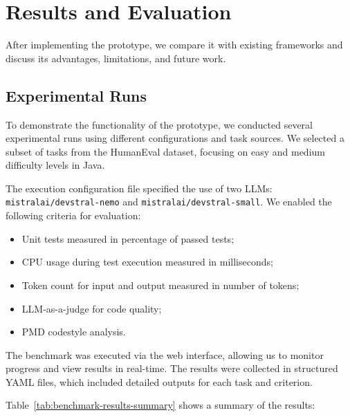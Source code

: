 \section{Results and Evaluation}

After implementing the prototype, we compare it with existing frameworks and discuss its advantages, limitations, and future work.

\subsection{Experimental Runs}

To demonstrate the functionality of the prototype, we conducted several experimental runs using different configurations and task sources.
We selected a subset of tasks from the HumanEval dataset, focusing on easy and medium difficulty levels in Java.

The execution configuration file specified the use of two LLMs: \texttt{mistralai/devstral-nemo} and \texttt{mistralai/devstral-small}.
We enabled the following criteria for evaluation:
\begin{itemize}
    \item Unit tests measured in percentage of passed tests;
    \item CPU usage during test execution measured in milliseconds;
    \item Token count for input and output measured in number of tokens;
    \item LLM-as-a-judge for code quality;
    \item PMD codestyle analysis.
\end{itemize}

The benchmark was executed via the web interface, allowing us to monitor progress and view results in real-time.
The results were collected in structured YAML files, which included detailed outputs for each task and criterion.

Table~\ref{tab:benchmark-results-summary} shows a summary of the results:


